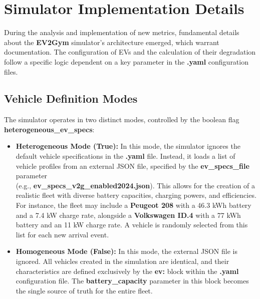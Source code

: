 \section{Simulator Implementation Details}
\label{sec:sim_architecture}
During the analysis and implementation of new metrics, fundamental details about the \textbf{EV2Gym} simulator's architecture emerged, which warrant documentation. The configuration of EVs and the calculation of their degradation follow a specific logic dependent on a key parameter in the \textbf{.yaml} configuration files.

\subsection{Vehicle Definition Modes}
The simulator operates in two distinct modes, controlled by the boolean flag \textbf{heterogeneous\_ev\_specs}:
\begin{itemize}
    \item \textbf{Heterogeneous Mode (\textbf{True}):} In this mode, the simulator ignores the default vehicle specifications in the \textbf{.yaml} file. Instead, it loads a list of vehicle profiles from an external JSON file, specified by the \textbf{ev\_specs\_file} parameter\\ \noindent (e.g., \textbf{ev\_specs\_v2g\_enabled2024.json}). This allows for the creation of a realistic fleet with diverse battery capacities, charging powers, and efficiencies. For instance, the fleet may include a \textbf{Peugeot 208} with a 46.3 kWh battery and a 7.4 kW charge rate, alongside a \textbf{Volkswagen ID.4} with a 77 kWh battery and an 11 kW charge rate. A vehicle is randomly selected from this list for each new arrival event.
    \item \textbf{Homogeneous Mode (\textbf{False}):} In this mode, the external JSON file is ignored. All vehicles created in the simulation are identical, and their characteristics are defined exclusively by the \textbf{ev:} block within the \textbf{.yaml} configuration file. The \textbf{battery\_capacity} parameter in this block becomes the single source of truth for the entire fleet.
\end{itemize}

